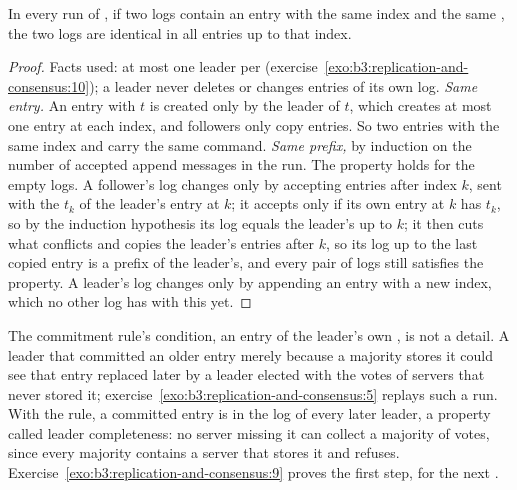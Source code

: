 \begin{theorem}\label{thm:b3:replication-and-consensus:log-matching}
In every run of , if two logs contain an entry with the same index and the same , the two logs are identical in all entries up to that index.
\end{theorem}

\begin{proof}
Facts used: at most one leader per  (exercise~\ref{exo:b3:replication-and-consensus:10}); a leader never deletes or changes entries of its own log. \emph{Same entry.} An entry with  $t$ is created only by the leader of $t$, which creates at most one entry at each index, and followers only copy entries. So two entries with the same index and  carry the same command. \emph{Same prefix,} by induction on the number of accepted append messages in the run. The property holds for the empty logs. A follower's log changes only by accepting entries after index $k$, sent with the  $t_k$ of the leader's entry at $k$; it accepts only if its own entry at $k$ has  $t_k$, so by the induction hypothesis its log equals the leader's up to $k$; it then cuts what conflicts and copies the leader's entries after $k$, so its log up to the last copied entry is a prefix of the leader's, and every pair of logs still satisfies the property. A leader's log changes only by appending an entry with a new index, which no other log has with this  yet.
\end{proof}

The commitment rule's condition, an entry of the leader's own , is not a detail. A leader that committed an older entry merely because a majority stores it could see that entry replaced later by a leader elected with the votes of servers that never stored it; exercise~\ref{exo:b3:replication-and-consensus:5} replays such a run. With the rule, a committed entry is in the log of every later leader, a property called leader completeness: no server missing it can collect a majority of votes, since every majority contains a server that stores it and refuses. Exercise~\ref{exo:b3:replication-and-consensus:9} proves the first step, for the next .

